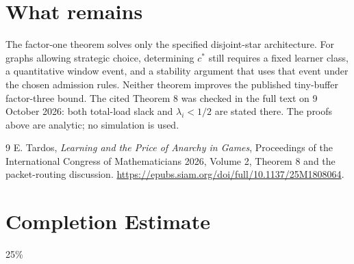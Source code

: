 \documentclass[11pt]{article}
\theoremstyle{definition}
\begin{document}
\section{What remains}
The factor-one theorem solves only the specified disjoint-star architecture.
For graphs allowing strategic choice, determining $c^*$ still requires a
fixed learner class, a quantitative window event, and a stability argument
that uses that event under the chosen admission rules. Neither theorem
improves the published tiny-buffer factor-three bound. The cited Theorem 8
was checked in the full text on 9 October 2026: both total-load slack and
$\lambda_i<1/2$ are stated there. The proofs above are analytic; no
simulation is used.
\begin{thebibliography}{9}
 E. Tardos, \emph{Learning and the Price of Anarchy in Games},
Proceedings of the International Congress of Mathematicians 2026,
Volume 2, Theorem 8 and the packet-routing discussion.
\url{https://epubs.siam.org/doi/full/10.1137/25M1808064}.
\end{thebibliography}

\section{Completion Estimate}
25\%
\end{document}
